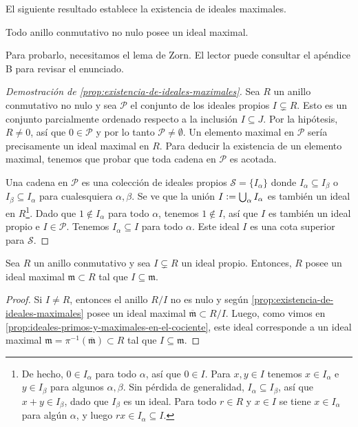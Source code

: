 El siguiente resultado establece la existencia de ideales maximales.

\begin{proposicion}
  \label{prop:existencia-de-ideales-maximales}
  Todo anillo conmutativo no nulo posee un ideal maximal.
\end{proposicion}

Para probarlo, necesitamos el lema de Zorn. El lector puede consultar
el apéndice B para revisar el enunciado.

\begin{proof}[Demostración de \ref{prop:existencia-de-ideales-maximales}]
  Sea $R$ un anillo conmutativo no nulo y sea $\mathcal{P}$ el conjunto de los
  ideales propios $I \subsetneq R$. Esto es un conjunto parcialmente ordenado
  respecto a la inclusión $I \subseteq J$. Por la hipótesis, $R \ne 0$, así que
  $0 \in \mathcal{P}$ y por lo tanto $\mathcal{P} \ne \emptyset$. Un elemento
  maximal en $\mathcal{P}$ sería precisamente un ideal maximal en $R$. Para
  deducir la existencia de un elemento maximal, tenemos que probar que toda
  cadena en $\mathcal{P}$ es acotada.

  Una cadena en $\mathcal{P}$ es una colección de ideales propios
  $\mathcal{S} = \{ I_\alpha \}$ donde $I_\alpha \subseteq I_\beta$ o
  $I_\beta \subseteq I_\alpha$ para cualesquiera $\alpha, \beta$. Se ve que la
  unión $I \mathrel{\mathop:}= \bigcup_\alpha I_\alpha$ es también un ideal en $R$\footnote{De
    hecho, $0 \in I_\alpha$ para todo $\alpha$, así que $0 \in I$. Para
    $x,y \in I$ tenemos $x\in I_\alpha$ e $y\in I_\beta$ para algunos
    $\alpha,\beta$. Sin pérdida de generalidad, $I_\alpha \subseteq I_\beta$,
    así que $x+y \in I_\beta$, dado que $I_\beta$ es un ideal. Para todo
    $r\in R$ y $x \in I$ se tiene $x \in I_\alpha$ para algún $\alpha$, y luego
    $rx \in I_\alpha \subseteq I$.}. Dado que $1 \notin I_\alpha$ para todo
  $\alpha$, tenemos $1\notin I$, así que $I$ es también un ideal propio e
  $I \in \mathcal{P}$. Tenemos $I_\alpha \subseteq I$ para todo $\alpha$. Este
  ideal $I$ es una cota superior para $\mathcal{S}$.
\end{proof}

\begin{corolario}
  Sea $R$ un anillo conmutativo y sea $I \subsetneq R$ un ideal
  propio. Entonces, $R$ posee un ideal maximal $\mathfrak{m} \subset R$ tal que
  $I \subseteq \mathfrak{m}$.

  \begin{proof}
    Si $I \ne R$, entonces el anillo $R/I$ no es nulo y según
    \ref{prop:existencia-de-ideales-maximales} posee un ideal maximal
    $\overline{\mathfrak{m}} \subset R/I$. Luego, como vimos en
    \ref{prop:ideales-primos-y-maximales-en-el-cociente}, este ideal corresponde
    a un ideal maximal
    $\mathfrak{m} = \pi^{-1} (\overline{\mathfrak{m}}) \subset R$ tal que
    $I \subseteq \mathfrak{m}$.
  \end{proof}
\end{corolario}

